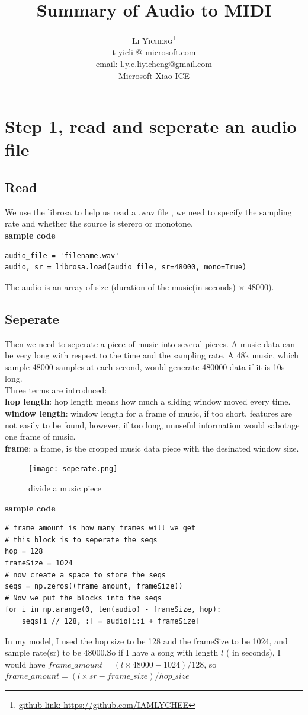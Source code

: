 \documentclass[twoside]{article}
\title{\vspace{-15mm}\fontsize{24pt}{10pt}\selectfont\textbf{Summary of Audio to MIDI }} %
\author{
\large
\textsc{Li Yicheng}\thanks{\href{https://github.com/IAMLYCHEE?tab=repositories}{github link: https://github.com/IAMLYCHEE} }\\[2mm] %
\normalsize t-yicli @ microsoft.com\\
\normalsize email: l.y.c.liyicheng@gmail.com \\ %
\normalsize Microsoft Xiao ICE \\
\vspace{-5mm}
}
\date{}
\begin{document}
\maketitle

\section{Step 1, read and seperate an audio file}
\subsection{Read}
We use the librosa to help us read a .wav file , we need to specify the sampling rate and whether the source is sterero or monotone.\\

\textbf{sample code}
\begin{lstlisting}
audio_file = 'filename.wav'
audio, sr = librosa.load(audio_file, sr=48000, mono=True)
\end{lstlisting}
The audio is an array of size (duration of the music(in seconds) $\times$ 48000).
\subsection{Seperate}
Then we need to seperate a piece of music into several pieces. A music data can be very long with respect to the time and the sampling rate. A 48k music, which sample 48000 samples at each second, would generate 480000 data if it is 10s long. \\
Three terms are introduced:\\
\textbf{hop length}: hop length means how much a sliding window moved every time.\\
\textbf{window length}: window length for a frame of music, if too short, features are not easily 
to be found, however, if too long, unuseful information would sabotage one frame of music.\\
\textbf{frame}: a frame, is the cropped music data piece with the desinated window size.\\

\begin{figure}[H]
   \centering
   \texttt{[image: seperate.png]}  
   \caption{divide a music piece}
\end{figure}
\textbf{sample code}
\begin{lstlisting}
# frame_amount is how many frames will we get
# this block is to seperate the seqs
hop = 128
frameSize = 1024
# now create a space to store the seqs
seqs = np.zeros((frame_amount, frameSize))
# Now we put the blocks into the seqs
for i in np.arange(0, len(audio) - frameSize, hop):
    seqs[i // 128, :] = audio[i:i + frameSize]
\end{lstlisting}
In my model, I used the hop size to be 128 and the frameSize to be 1024, and sample rate(sr) to be 48000.So if I have a song with length $l$ ( in seconds), I would have $frame\_amount = (l\times 48000 - 1024)/128$, so $ frame\_amount = (l \times sr - frame\_size)/hop\_size$ \\
\end{document}
